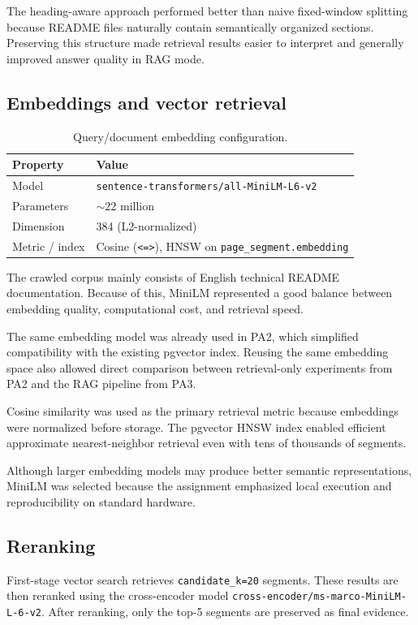 \documentclass[11pt,a4paper]{article}
\begin{document}
The heading-aware approach performed better than naive fixed-window splitting because README files naturally contain semantically organized sections. Preserving this structure made retrieval results easier to interpret and generally improved answer quality in RAG mode.

\subsection{Embeddings and vector retrieval}

\begin{table}[ht]
\centering
\small
\begin{tabular}{ll}
\toprule
Property & Value \\
\midrule
Model & \texttt{sentence-transformers/all-MiniLM-L6-v2} \\
Parameters & \(\sim 22\) million \\
Dimension & 384 (L2-normalized) \\
Metric / index & Cosine (\texttt{<=>}), HNSW on \texttt{page\_segment.embedding} \\
\bottomrule
\end{tabular}
\caption{Query/document embedding configuration.}
\label{tab:embedding}
\end{table}

The crawled corpus mainly consists of English technical README documentation. Because of this, MiniLM represented a good balance between embedding quality, computational cost, and retrieval speed.

The same embedding model was already used in PA2, which simplified compatibility with the existing pgvector index. Reusing the same embedding space also allowed direct comparison between retrieval-only experiments from PA2 and the RAG pipeline from PA3.

Cosine similarity was used as the primary retrieval metric because embeddings were normalized before storage. The pgvector HNSW index enabled efficient approximate nearest-neighbor retrieval even with tens of thousands of segments.

Although larger embedding models may produce better semantic representations, MiniLM was selected because the assignment emphasized local execution and reproducibility on standard hardware.

\subsection{Reranking}
First-stage vector search retrieves \texttt{candidate\_k=20} segments. These results are then reranked using the cross-encoder model \texttt{cross-encoder/ms-marco-MiniLM-L-6-v2}. After reranking, only the top-5 segments are preserved as final evidence.
\end{document}
